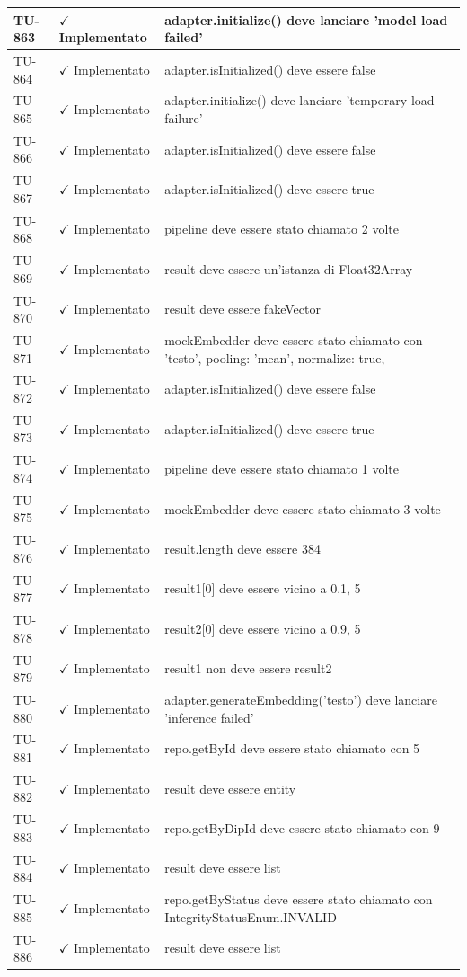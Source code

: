 ﻿\documentclass[a4paper,12pt]{article}
\newcommand{\ok}{\textcolor{green!60!black}{$\checkmark$ Implementato}}
\begin{document}
\begin{longtable}{|p{2cm}|p{3.5cm}|p{9.5cm}|}
\hline
TU-863 & \ok & adapter.initialize() deve lanciare 'model load failed' \\
\hline
TU-864 & \ok & adapter.isInitialized() deve essere false \\
\hline
TU-865 & \ok & adapter.initialize() deve lanciare 'temporary load failure' \\
\hline
TU-866 & \ok & adapter.isInitialized() deve essere false \\
\hline
TU-867 & \ok & adapter.isInitialized() deve essere true \\
\hline
TU-868 & \ok & pipeline deve essere stato chiamato 2 volte \\
\hline
TU-869 & \ok & result deve essere un'istanza di Float32Array \\
\hline
TU-870 & \ok & result deve essere fakeVector \\
\hline
TU-871 & \ok & mockEmbedder deve essere stato chiamato con 'testo', { pooling: 'mean', normalize: true, } \\
\hline
TU-872 & \ok & adapter.isInitialized() deve essere false \\
\hline
TU-873 & \ok & adapter.isInitialized() deve essere true \\
\hline
TU-874 & \ok & pipeline deve essere stato chiamato 1 volte \\
\hline
TU-875 & \ok & mockEmbedder deve essere stato chiamato 3 volte \\
\hline
TU-876 & \ok & result.length deve essere 384 \\
\hline
TU-877 & \ok & result1[0] deve essere vicino a 0.1, 5 \\
\hline
TU-878 & \ok & result2[0] deve essere vicino a 0.9, 5 \\
\hline
TU-879 & \ok & result1 non deve essere result2 \\
\hline
TU-880 & \ok & adapter.generateEmbedding('testo') deve lanciare 'inference failed' \\
\hline
TU-881 & \ok & repo.getById deve essere stato chiamato con 5 \\
\hline
TU-882 & \ok & result deve essere entity \\
\hline
TU-883 & \ok & repo.getByDipId deve essere stato chiamato con 9 \\
\hline
TU-884 & \ok & result deve essere list \\
\hline
TU-885 & \ok & repo.getByStatus deve essere stato chiamato con IntegrityStatusEnum.INVALID \\
\hline
TU-886 & \ok & result deve essere list \\

\end{longtable}
\end{document}

